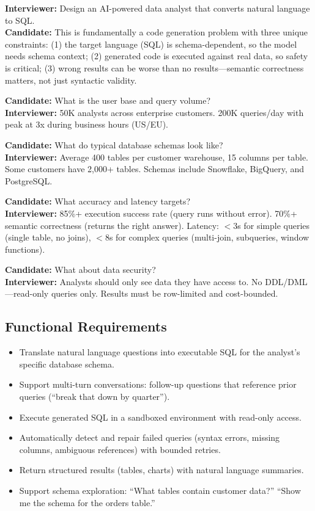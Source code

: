 \textbf{Interviewer:} Design an AI-powered data analyst that converts natural language to SQL.\\
\textbf{Candidate:} This is fundamentally a code generation problem with three unique constraints: (1) the target language (SQL) is schema-dependent, so the model needs schema context; (2) generated code is executed against real data, so safety is critical; (3) wrong results can be worse than no results---semantic correctness matters, not just syntactic validity.

\textbf{Candidate:} What is the user base and query volume?\\
\textbf{Interviewer:} 50K analysts across enterprise customers. 200K queries/day with peak at 3x during business hours (US/EU).

\textbf{Candidate:} What do typical database schemas look like?\\
\textbf{Interviewer:} Average 400 tables per customer warehouse, 15 columns per table. Some customers have 2,000+ tables. Schemas include Snowflake, BigQuery, and PostgreSQL.

\textbf{Candidate:} What accuracy and latency targets?\\
\textbf{Interviewer:} 85\%+ execution success rate (query runs without error). 70\%+ semantic correctness (returns the right answer). Latency: $<$3s for simple queries (single table, no joins), $<$8s for complex queries (multi-join, subqueries, window functions).

\textbf{Candidate:} What about data security?\\
\textbf{Interviewer:} Analysts should only see data they have access to. No DDL/DML---read-only queries only. Results must be row-limited and cost-bounded.

\subsection*{Functional Requirements}

\begin{itemize}
  \item Translate natural language questions into executable SQL for the analyst's specific database schema.
  \item Support multi-turn conversations: follow-up questions that reference prior queries (``break that down by quarter'').
  \item Execute generated SQL in a sandboxed environment with read-only access.
  \item Automatically detect and repair failed queries (syntax errors, missing columns, ambiguous references) with bounded retries.
  \item Return structured results (tables, charts) with natural language summaries.
  \item Support schema exploration: ``What tables contain customer data?'' ``Show me the schema for the orders table.''
\end{itemize}

